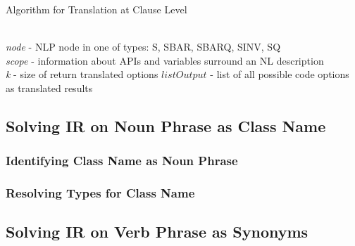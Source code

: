 \makeatletter
\def\BState{\State\hskip-\ALG@thistlm}
\makeatother
\begin{algorithm}
	\caption{Algorithm for Translation at Clause Level}
	\label{alg:TranslateClause}
	\begin{algorithmic}
		\Require \\
		 \textit{node} - NLP node in one of types: S, 	SBAR, SBARQ, SINV, SQ	\\
		 \textit{scope} - information about APIs and variables surround an NL description \\
		  \textit{k} - size of return translated options
		\Ensure $listOutput$ - list of all possible code options as translated results  
		\Else
			
			\EndFor
		\EndFor
		\EndIf
		\EndFunction
	\end{algorithmic}
\end{algorithm}

\subsection{Solving IR on Noun Phrase as Class Name}
\subsubsection{Identifying  Class Name as Noun Phrase}
\subsubsection{Resolving Types for  Class Name}
\subsection{Solving IR on Verb Phrase as Synonyms}
